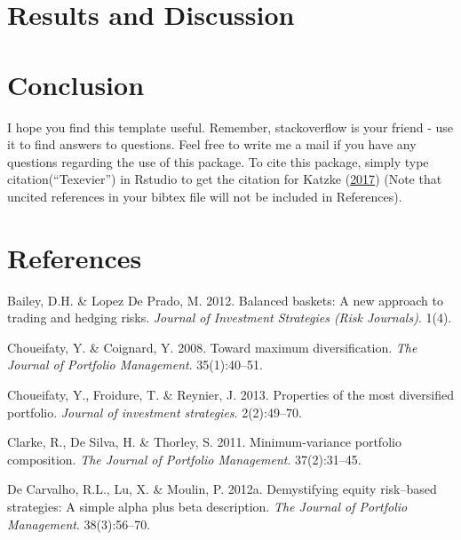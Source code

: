 \documentclass[11pt,preprint, authoryear]{elsarticle}
\numberwithin{equation}{section}
\numberwithin{figure}{section}
\numberwithin{table}{section}
\begin{document}
\hypertarget{results-and-discussion}{%
\section{Results and Discussion}\label{results-and-discussion}}

\hypertarget{conclusion}{%
\section{Conclusion}\label{conclusion}}

I hope you find this template useful. Remember, stackoverflow is your
friend - use it to find answers to questions. Feel free to write me a
mail if you have any questions regarding the use of this package. To
cite this package, simply type citation(``Texevier'') in Rstudio to get
the citation for Katzke (\protect\hyperlink{ref-Texevier}{2017}) (Note
that uncited references in your bibtex file will not be included in
References).

\newpage

\hypertarget{references}{%
\section*{References}\label{references}}

\hypertarget{refs}{}
\leavevmode\hypertarget{ref-lopez2012}{}%
Bailey, D.H. \& Lopez De Prado, M. 2012. Balanced baskets: A new
approach to trading and hedging risks. \emph{Journal of Investment
Strategies (Risk Journals)}. 1(4).

\leavevmode\hypertarget{ref-choueifaty2008}{}%
Choueifaty, Y. \& Coignard, Y. 2008. Toward maximum diversification.
\emph{The Journal of Portfolio Management}. 35(1):40--51.

\leavevmode\hypertarget{ref-choueifaty2013}{}%
Choueifaty, Y., Froidure, T. \& Reynier, J. 2013. Properties of the most
diversified portfolio. \emph{Journal of investment strategies}.
2(2):49--70.

\leavevmode\hypertarget{ref-clarke2011}{}%
Clarke, R., De Silva, H. \& Thorley, S. 2011. Minimum-variance portfolio
composition. \emph{The Journal of Portfolio Management}. 37(2):31--45.

\leavevmode\hypertarget{ref-rawl2012}{}%
De Carvalho, R.L., Lu, X. \& Moulin, P. 2012a. Demystifying equity
risk--based strategies: A simple alpha plus beta description. \emph{The
Journal of Portfolio Management}. 38(3):56--70.
\end{document}
